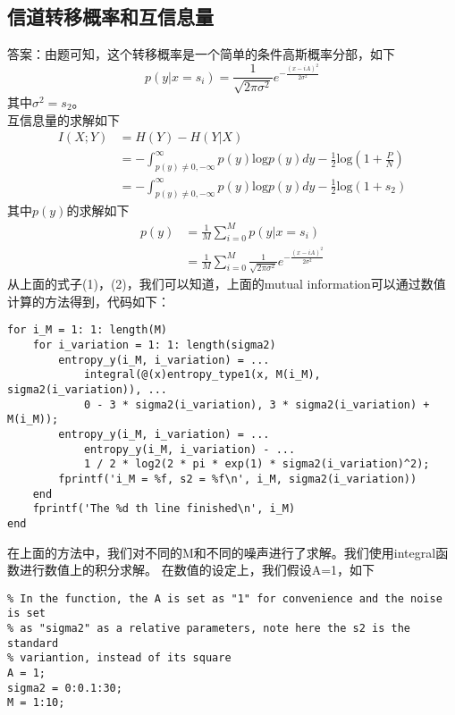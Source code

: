 \documentclass{article}
\begin{document}
\subsection{信道转移概率和互信息量}
答案：由题可知，这个转移概率是一个简单的条件高斯概率分部，如下
\begin{equation}
p(y|x = s_i) = \frac{1}{\sqrt{2\pi\sigma^2}} e^{-\frac{(x-iA)^2}{2\sigma^2}}
\end{equation}
其中\(\sigma^2 = s_2\)。\\
互信息量的求解如下
\begin{equation}
\begin{aligned}
I(X;Y) & = H(Y) - H(Y|X)\\
	   & = -\int_{p(y) \neq 0, -\infty}^{\infty}p(y)\mbox{log}p(y)dy - \frac{1}{2}\mbox{log}(1 + \frac{P}{N})\\
	   & = -\int_{p(y) \neq 0, -\infty}^{\infty}p(y)\mbox{log}p(y)dy - \frac{1}{2}\mbox{log}(1 + s_2)
\end{aligned}
\end{equation}
其中\(p(y)\)的求解如下
\begin{equation}
\begin{aligned}
p(y) &= \frac{1}{M}\sum\limits_{i = 0}^{M}p(y|x = s_i)\\
	 &= \frac{1}{M}\sum\limits_{i = 0}^{M}\frac{1}{\sqrt{2\pi\sigma^2}} e^{-\frac{(x-iA)^2}{2\sigma^2}}
\end{aligned}
\end{equation}
从上面的式子(1)，(2)，我们可以知道，上面的mutual information可以通过数值计算的方法得到，代码如下：
\begin{lstlisting}
for i_M = 1: 1: length(M)
    for i_variation = 1: 1: length(sigma2)
        entropy_y(i_M, i_variation) = ...
            integral(@(x)entropy_type1(x, M(i_M), sigma2(i_variation)), ...
            0 - 3 * sigma2(i_variation), 3 * sigma2(i_variation) + M(i_M));
        entropy_y(i_M, i_variation) = ...
            entropy_y(i_M, i_variation) - ...
            1 / 2 * log2(2 * pi * exp(1) * sigma2(i_variation)^2);
        fprintf('i_M = %f, s2 = %f\n', i_M, sigma2(i_variation))
    end
    fprintf('The %d th line finished\n', i_M)
end
\end{lstlisting}
在上面的方法中，我们对不同的M和不同的噪声进行了求解。我们使用integral函数进行数值上的积分求解。
在数值的设定上，我们假设A=1，如下
\begin{lstlisting}
% In the function, the A is set as "1" for convenience and the noise is set
% as "sigma2" as a relative parameters, note here the s2 is the standard
% variantion, instead of its square
A = 1;
sigma2 = 0:0.1:30;
M = 1:10;
\end{lstlisting}
\end{document}

